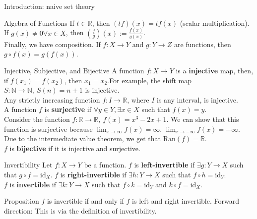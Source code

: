 \documentclass[8pt]{extarticle}
\begin{document}
{\begin{problem}{Introduction: naive set theory}
\begin{problem}{Algebra of Functions}
      If $t\in \mathbb{R}$, then $(tf)(x) = tf(x)$ (scalar multiplication). If $g(x)\neq 0\forall x\in X$, then $\left(\frac{f}{g}\right)(x) := \frac{f(x)}{g(x)}$.\\

      Finally, we have composition. If $f:X\rightarrow Y$ and $g:Y\rightarrow Z$ are functions, then $g\circ f(x) = g(f(x))$.
    \end{problem}
    \begin{problem}{Injective, Subjective, and Bijective}
      A function $f:X\rightarrow Y$ is a \textbf{injective} map, then, if $f(x_1) = f(x_2)$, then $x_1 = x_2$.For example, the shift map $S:\mathbb{N} \rightarrow \mathbb{N},~S(n) = n+1$ is injective.\\

      Any strictly increasing function $f:I\rightarrow \mathbb{R}$, where $I$ is any interval, is injective.\\

      A function $f$ is \textbf{surjective} if $\forall y\in Y, \exists x\in X$ such that $f(x) = y$.\\

      Consider the function $f:\mathbb{R} \rightarrow \mathbb{R},~f(x) = x^3-2x+1$. We can show that this function is surjective because $\lim_{x\rightarrow \infty}f(x) = \infty$, $\lim_{x\rightarrow -\infty} f(x) = -\infty$. Due to the intermediate value theorem, we get that $\textrm{Ran}(f) = \mathbb{R}$.\\

      $f$ is \textbf{bijective} if it is injective and surjective.
    \end{problem}
    \begin{problem}{Invertibility}
      Let $f:X\rightarrow Y$ be a function. $f$ is \textbf{left-invertible} if $\exists g:Y\rightarrow X$ such that $g\circ f = \textrm{id}_X$. $f$ is \textbf{right-invertible} if $\exists h:Y\rightarrow X$ such that $f\circ h = \textrm{id}_Y$.\\

      $f$ is \textbf{invertible} if $\exists k:Y\rightarrow X$ such that $f\circ k = \textrm{id}_Y$ and $k\circ f = \textrm{id}_X$.\\

      \begin{problem}{Proposition}
        $f$ is invertible if and only if $f$ is left and right invertible.
        \tcblower
          Forward direction: This is via the definition of invertibility.\\


\end{problem}
\end{problem}
\end{problem}}
\end{document}
